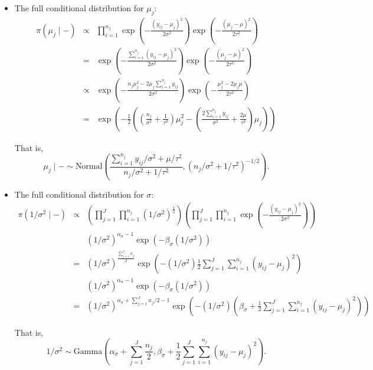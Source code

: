 \documentclass[11pt]{article}
\begin{document}
\begin{itemize}
\item The full conditional distribution for $\mu_j$:
\begin{eqnarray}
\pi(\mu_j \mid -) &\propto&  \prod_{i=1}^{n_j} \exp\left(-\frac{(y_{ij}-\mu_j)^2}{2\sigma^2}\right)\exp\left(-\frac{(\mu_j-\mu)^2}{2\tau^2}\right) \nonumber \\
&=&\exp\left(-\frac{\sum_{i=1}^{n_j}(y_{ij}-\mu_j)^2}{2\sigma^2}\right)\exp\left(-\frac{(\mu_j-\mu)^2}{2\tau^2}\right) \nonumber \\
&\propto& \exp\left(-\frac{n_j\mu_j^2 - 2\mu_j \sum_{i=1}^{n_j}y_{ij}}{2\sigma^2}\right)\exp\left(-\frac{\mu_j^2 - 2\mu_j\mu}{2\tau^2}\right) \nonumber \\
&=& \exp\left(-\frac{1}{2}\left(\left(\frac{n_j}{\sigma^2}+\frac{1}{\tau^2}\right)\mu_j^2 - \left(\frac{2\sum_{i=1}^{n_j}y_{ij}}{\sigma^2} + \frac{2\mu}{\tau^2}\right)\mu_j\right)\right)
\end{eqnarray}

That is,
\begin{equation}
\mu_j \mid - \sim \textrm{Normal}\left(\frac{\sum_{i=1}^{n_j}y_{ij}/\sigma^2 + \mu/\tau^2}{n_j/\sigma^2 + 1/\tau^2}, (n_j/\sigma^2 + 1/\tau^2)^{-1/2}\right).
\end{equation}


\item The full conditional distribution for $\sigma$:
\begin{eqnarray}
\pi(1/\sigma^2 \mid -) &\propto& \left(\prod_{j=1}^{J}\prod_{i=1}^{n_j}(1/\sigma^2)^{\frac{1}{2}}\right)\left(\prod_{j=1}^{J}\prod_{i=1}^{n_j}\exp\left(-\frac{(y_{ij} - \mu_j)^2}{2\sigma^2}\right)\right) \nonumber \\
&&(1/\sigma^2)^{\alpha_{\sigma}-1} \exp(-\beta_{\sigma}(1/\sigma^2)) \nonumber \\
&=&(1/\sigma^2)^{\frac{\sum_{j=1}^{J}n_j}{2}} \exp\left(-(1/\sigma^2)\frac{1}{2}\sum_{j=1}^{J}\sum_{i=1}^{n_j}(y_{ij}-\mu_j)^2\right)\nonumber \\
&&(1/\sigma^2)^{\alpha_{\sigma}-1} \exp(-\beta_{\sigma}(1/\sigma^2)) \nonumber \\
&=&(1/\sigma^2)^{\alpha_{\sigma} + \sum_{j=1}^{J}n_j/2 - 1} \exp\left(-(1/\sigma^2)\left(\beta_{\sigma} + \frac{1}{2}\sum_{j=1}^{J}\sum_{i=1}^{n_j}(y_{ij}-\mu_j)^2\right)\right)
\end{eqnarray}

That is,
\begin{equation}
1/\sigma^2 \sim \textrm{Gamma}\left(\alpha_{\sigma} + \sum_{j=1}^{J}\frac{n_j}{2}, \beta_{\sigma} + \frac{1}{2}\sum_{j=1}^{J}\sum_{i=1}^{n_j}(y_{ij}-\mu_j)^2\right).
\end{equation}
\end{itemize}
\end{document}
